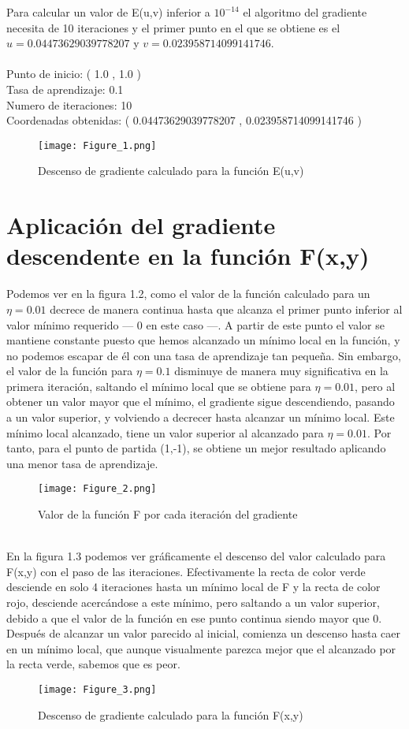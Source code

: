 Para calcular un valor de E(u,v) inferior a $ 10^{-14} $ el algoritmo del gradiente necesita de 10 iteraciones y el primer punto en el que se obtiene es el $ u =  0.04473629039778207 $ y $ v =  0.023958714099141746 $.\\
\\
Punto de inicio: ( 1.0 ,  1.0 )\\
Tasa de aprendizaje:  0.1\\
Numero de iteraciones:  10\\
Coordenadas obtenidas: ( 0.04473629039778207 ,  0.023958714099141746 )\\

\begin{figure}[h]
   \centering
   \texttt{[image: Figure\_1.png]}
   \caption{Descenso de gradiente calculado para la función E(u,v)}
\end{figure}
\newpage
\section{Aplicación del gradiente descendente en la función F(x,y)}
Podemos ver en la figura 1.2, como el valor de la función calculado para un $ \eta = 0.01 $ decrece de manera continua hasta que alcanza el primer punto inferior al valor mínimo requerido --- 0 en este caso ---. A partir de este punto el valor se mantiene constante puesto que hemos alcanzado un mínimo local en la función, y no podemos escapar de él con una tasa de aprendizaje tan pequeña. Sin embargo, el valor de la función para $ \eta = 0.1 $ disminuye de manera muy significativa en la primera iteración, saltando el mínimo local que se obtiene para $ \eta = 0.01 $, pero al obtener un valor mayor que el mínimo, el gradiente sigue descendiendo, pasando a un valor superior, y volviendo a decrecer hasta alcanzar un mínimo local. Este mínimo local alcanzado, tiene un valor superior al alcanzado para $ \eta = 0.01 $. Por tanto, para el punto de partida (1,-1), se obtiene un mejor resultado aplicando una menor tasa de aprendizaje.
\begin{figure}[h]
   \centering
   \texttt{[image: Figure\_2.png]}
   \caption{Valor de la función F por cada iteración del gradiente}
\end{figure}
\\
En la figura 1.3 podemos ver gráficamente el descenso del valor calculado para F(x,y) con el paso de las iteraciones. Efectivamente la recta de color verde desciende en solo 4 iteraciones hasta un mínimo local de F y la recta de color rojo, desciende acercándose a este mínimo, pero saltando a un valor superior, debido a que el valor de la función en ese punto continua siendo mayor que 0. Después de alcanzar un valor parecido al inicial, comienza un descenso hasta caer en un mínimo local, que aunque visualmente parezca mejor que el alcanzado por la recta verde, sabemos que es peor.
\newpage
\begin{figure}[h]
   \centering
   \texttt{[image: Figure\_3.png]}
   \caption{Descenso de gradiente calculado para la función F(x,y)}
\end{figure}

